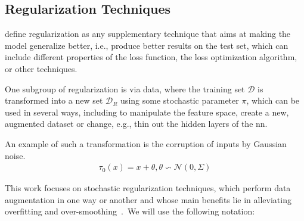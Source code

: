\subsection{Regularization Techniques}
\label{sec:related:pred:regularization}

\citet{Kukacka2017} define regularization as any supplementary technique that aims at making the model generalize better, i.e., produce better results on the test set, which can include different properties of the loss function, the loss optimization algorithm, or other techniques.

One subgroup of regularization is via data, where the training set $\mathcal{D}$ is transformed into a new set $\mathcal{D}_{R}$ using some stochastic parameter $\pi$, which can be used in several ways, including to manipulate the feature space,
create a new, augmented dataset or change, e.g., thin out the hidden layers of the \ac{nn}.

An example of such a transformation is the corruption of inputs by Gaussian noise.
\begin{align*}
    \tau_{0}(x) = x + \theta, \theta \backsim \mathcal{N}(0, \Sigma)
\end{align*}

This work focuses on stochastic regularization techniques, which perform data augmentation in one way or another and whose main benefits lie in alleviating overfitting and over-smoothing~\cite{Hasanzadeh2020}.\
We will use the following notation: \

